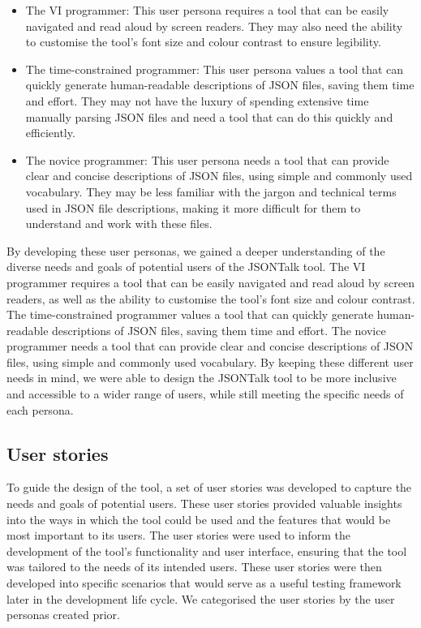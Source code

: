 \documentclass{l4proj}
\begin{document}
\begin{itemize}
    \item The VI programmer: This user persona requires a tool that can be easily navigated and read aloud by screen readers. They may also need the ability to customise the tool's font size and colour contrast to ensure legibility. 
    \item The time-constrained programmer: This user persona values a tool that can quickly generate human-readable descriptions of JSON files, saving them time and effort. They may not have the luxury of spending extensive time manually parsing JSON files and need a tool that can do this quickly and efficiently. 
    \item The novice programmer: This user persona needs a tool that can provide clear and concise descriptions of JSON files, using simple and commonly used vocabulary. They may be less familiar with the jargon and technical terms used in JSON file descriptions, making it more difficult for them to understand and work with these files. 
\end{itemize}

By developing these user personas, we gained a deeper understanding of the diverse needs and goals of potential users of the JSONTalk tool. The VI programmer requires a tool that can be easily navigated and read aloud by screen readers, as well as the ability to customise the tool's font size and colour contrast. The time-constrained programmer values a tool that can quickly generate human-readable descriptions of JSON files, saving them time and effort. The novice programmer needs a tool that can provide clear and concise descriptions of JSON files, using simple and commonly used vocabulary. By keeping these different user needs in mind, we were able to design the JSONTalk tool to be more inclusive and accessible to a wider range of users, while still meeting the specific needs of each persona. 

\subsection{User stories}

To guide the design of the tool, a set of user stories was developed to capture the needs and goals of potential users. These user stories provided valuable insights into the ways in which the tool could be used and the features that would be most important to its users. The user stories were used to inform the development of the tool's functionality and user interface, ensuring that the tool was tailored to the needs of its intended users. These user stories were then developed into specific scenarios that would serve as a useful testing framework later in the development life cycle. We categorised the user stories by the user personas created prior.
\end{document}
